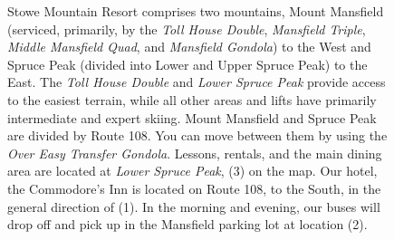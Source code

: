 \begin{figure}
  \centering
  \caption{Stowe Mountain Resort comprises two mountains, Mount Mansfield (serviced, primarily, by the \emph{Toll House Double}, \emph{Mansfield Triple}, \emph{Middle Mansfield Quad}, and \emph{Mansfield Gondola}) to the West and Spruce Peak (divided into Lower and Upper Spruce Peak) to the East.
    The \emph{Toll House Double} and \emph{Lower Spruce Peak} provide access to the easiest terrain, while all other areas and lifts have primarily intermediate and expert skiing.
    Mount Mansfield and Spruce Peak are divided by Route 108.
    You can move between them by using the \emph{Over Easy Transfer Gondola}.
    Lessons, rentals, and the main dining area are located at \emph{Lower Spruce Peak}, (3) on the map.
    Our hotel, the Commodore's Inn is located on Route 108, to the South, in the general direction of (1).
    In the morning and evening, our buses will drop off and pick up in the Mansfield parking lot at location (2).
  }
\end{figure}



